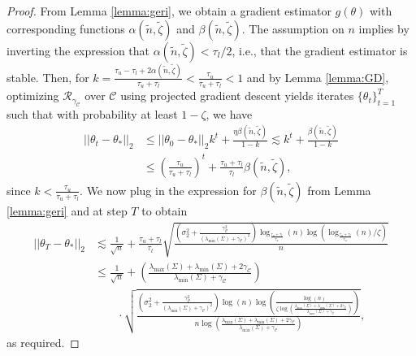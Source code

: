 \documentclass{article}
\begin{document}
\begin{proof}
From Lemma \ref{lemma:geri}, we obtain a gradient estimator $g(\theta)$ with corresponding functions $\alpha(\widetilde{n}, \widetilde{\zeta})$ and $\beta(\widetilde{n}, \widetilde{\zeta})$. The assumption on $n$ implies by inverting the expression that $\alpha(\widetilde{n}, \widetilde{\zeta}) < \tau_l/2$, i.e., that the gradient estimator is stable. Then, for $k = \frac{\tau_u - \tau_l + 2\alpha(\widetilde{n}, \widetilde{\zeta})}{\tau_u + \tau_l} < \frac{\tau_u}{\tau_u + \tau_l} < 1$ and by Lemma \ref{lemma:GD}, optimizing $\mathcal{R}_{\gamma_{\mathcal{C}}}$ over $\mathcal{C}$ using projected gradient descent yields iterates $\{\theta_t\}_{t = 1}^T$ such that with probability at least $1 - \zeta$, we have
\begin{align*}
||\theta_t - \theta_{*}||_2 &\leq ||\theta_0 - \theta_{*}||_2k^t + \frac{\eta\beta(\widetilde{n}, \widetilde{\zeta})}{1 - k} \lesssim k^t + \frac{\beta(\widetilde{n}, \widetilde{\zeta})}{1 - k}\\
&\leq \left(\frac{\tau_u}{\tau_u + \tau_l}\right)^t + \frac{\tau_u + \tau_l}{\tau_l}\beta(\widetilde{n}, \widetilde{\zeta}),
\end{align*}
since $k < \frac{\tau_u}{\tau_u + \tau_l}$. We now plug in the expression for $\beta(\widetilde{n}, \widetilde{\zeta})$ from Lemma \ref{lemma:geri} and at step $T$ to obtain
\begin{align*}
||\theta_T - \theta_{*}||_2 &\lesssim \frac{1}{\sqrt{n}} + \frac{\tau_u + \tau_l}{\tau_l}\sqrt{\frac{\left(\sigma_2^2 + \frac{\gamma_{\mathcal{C}}^2}{(\lambda_{\min}(\Sigma) + \gamma_{\mathcal{C}})^2}\right)\log_{\frac{\tau_u + \tau_l}{\tau_u}}(n)\log\left(\log_{\frac{\tau_u + \tau_l}{\tau_u}}(n)/\zeta\right)}{n}}\\
&\leq \frac{1}{\sqrt{n}} + \left(\frac{\lambda_{\max}(\Sigma) + \lambda_{\min}(\Sigma) + 2\gamma_{\mathcal{C}}}{\lambda_{\min}(\Sigma) + \gamma_{\mathcal{C}}}\right)\\
& \qquad \cdot \sqrt{\frac{\left(\sigma_2^2 + \frac{\gamma_{\mathcal{C}}^2}{(\lambda_{\min}(\Sigma) + \gamma_{\mathcal{C}})^2}\right)\log(n)\log\left(\frac{\log(n)}{\zeta\log\left(\frac{\lambda_{\max}(\Sigma) + \lambda_{\min}(\Sigma) + 2\gamma_{\mathcal{C}}}{\lambda_{\max}(\Sigma) + \gamma_{\mathcal{C}}}\right)}\right)}{n\log\left(\frac{\lambda_{\max}(\Sigma) + \lambda_{\min}(\Sigma) + 2\gamma_{\mathcal{C}}}{\lambda_{\max}(\Sigma) + \gamma_{\mathcal{C}}}\right)}},
\end{align*}
as required.
\end{proof}
\end{document}
